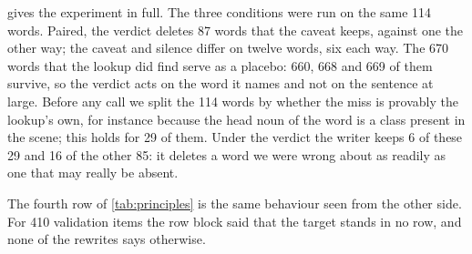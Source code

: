  gives the experiment in full.
The three conditions were run on the same 114 words.
Paired, the verdict deletes 87 words that the caveat keeps, against one the other way; the caveat and silence differ on twelve words, six each way.
The 670 words that the lookup did find serve as a placebo: 660, 668 and 669 of them survive, so the verdict acts on the word it names and not on the sentence at large.
Before any call we split the 114 words by whether the miss is provably the lookup's own, for instance because the head noun of the word is a class present in the scene; this holds for 29 of them.
Under the verdict the writer keeps 6 of these 29 and 16 of the other 85: it deletes a word we were wrong about as readily as one that may really be absent.


The fourth row of \cref{tab:principles} is the same behaviour seen from the other side.
For 410 validation items the row block said that the target stands in no row, and none of the rewrites says otherwise.

